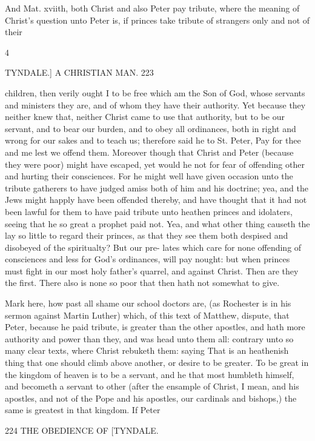 \documentclass{custom}
\begin{document}
{And Mat. xviith, both Christ and also Peter pay tribute, 
where the meaning of Christ's question unto Peter is, if 
princes take tribute of strangers only and not of their 

4 


TYNDALE.] 
A CHRISTIAN MAN.
223 

children, then verily ought I to be free which am the Son 
of God, whose servants and ministers they are, and of 
whom they have their authority. Yet because they neither 
knew that, neither Christ came to use that authority, but 
to be our servant, and to bear our burden, and to obey all 
ordinances, both in right and wrong for our sakes and to 
teach us; therefore said he to St. Peter, Pay for thee and 
me lest we offend them. Moreover though that Christ 
and Peter (because they were poor) might have escaped, 
yet would he not for fear of offending other and hurting 
their consciences. For he might well have given occasion 
unto the tribute gatherers to have judged amiss both of 
him and his doctrine; yea, and the Jews might happly 
have been offended thereby, and have thought that it had 
not been lawful for them to have paid tribute unto heathen 
princes and idolaters, seeing that he so great a prophet 
paid not. Yea, and what other thing causeth the lay 
so little to regard their princes, as that they see them both 
despised and disobeyed of the spiritualty? But our pre- 
lates which care for none offending of consciences and less
for God's ordinances, will pay nought: but when princes
must fight in our most holy father's quarrel, and against
Christ. Then are they the first. There also is none so 
poor that then hath not somewhat to give.

Mark here, how past all shame our school doctors are, 
(as Rochester is in his sermon against Martin Luther) 
which, of this text of Matthew, dispute, that Peter, because
he paid tribute, is greater than the other apostles, and hath
more authority and power than they, and was head unto 
them all: contrary unto so many clear texts, where Christ 
rebuketh them: saying That is an heathenish thing that one 
should climb above another, or desire to be greater. To be 
great in the kingdom of heaven is to be a servant, and he 
that most humbleth himself, and becometh a servant to 
other (after the ensample of Christ, I mean, and his apostles, 
and not of the Pope and his apostles, our cardinals and 
bishops,) the same is greatest in that kingdom. If Peter 


224
THE OBEDIENCE OF 
[TYNDALE. 

}
\end{document}
